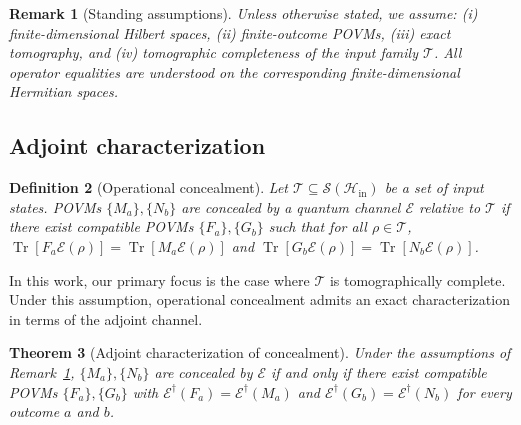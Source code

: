 \documentclass[
aps,pra,twocolumn,10pt,
superscriptaddress,longbibliography,floatfix
]{revtex4-2}
\DeclareMathOperator{\Tr}{Tr}
\newtheorem{theorem}{Theorem}[section]
\newtheorem{definition}[theorem]{Definition}
\newtheorem{remark}[theorem]{Remark}
\begin{document}
\begin{remark}[Standing assumptions]
\label{rem:assumptions}
Unless otherwise stated, we assume:
(i) finite-dimensional Hilbert spaces,
(ii) finite-outcome POVMs,
(iii) exact tomography, and
(iv) tomographic completeness of the input family $\mathcal T$.
All operator equalities are understood on the corresponding finite-dimensional Hermitian spaces.
\end{remark}

\subsection{Adjoint characterization}

\begin{definition}[Operational concealment]
\label{def:family}
Let $\mathcal{T} \subseteq \mathcal{S}(\mathcal{H}_{\mathrm{in}})$ be a set of input states. POVMs $\{M_a\},\{N_b\}$ are \emph{concealed} by a quantum channel $\mathcal{E}$ relative to $\mathcal{T}$ if there exist compatible POVMs $\{F_a\},\{G_b\}$ such that for all $\rho \in \mathcal{T}$,
$\Tr[F_a \mathcal{E}(\rho)] = \Tr[M_a \mathcal{E}(\rho)]$ and $\Tr[G_b \mathcal{E}(\rho)] = \Tr[N_b \mathcal{E}(\rho)]$.
\end{definition}

In this work, our primary focus is the case where $\mathcal{T}$ is tomographically complete. Under this assumption, operational concealment admits an exact characterization in terms of the adjoint channel.

\begin{theorem}[Adjoint characterization of concealment]
\label{thm:necessary_sufficient}
Under the assumptions of Remark~\ref{rem:assumptions}, $\{M_a\},\{N_b\}$ are concealed by $\mathcal{E}$ if and only if there exist compatible POVMs $\{F_a\},\{G_b\}$ with $\mathcal{E}^\dagger(F_a) = \mathcal{E}^\dagger(M_a)$ and $\mathcal{E}^\dagger(G_b) = \mathcal{E}^\dagger(N_b)$ for every outcome $a$ and $b$.
\end{theorem}
\end{document}
